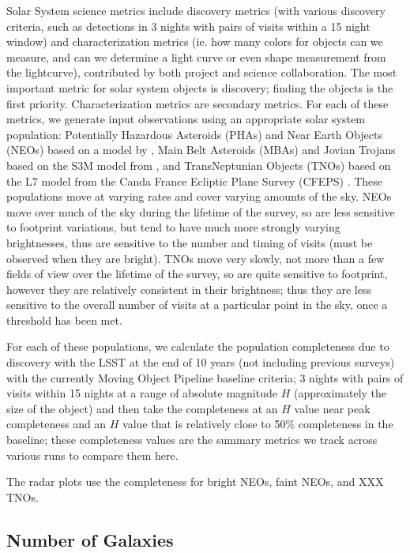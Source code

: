 Solar System science metrics include discovery metrics (with various discovery criteria, such as detections in 3 nights with pairs of visits within a 15 night window) and characterization metrics (ie. how many colors for objects can we measure, and can we determine a light curve or even shape measurement from the lightcurve), contributed by both project and science collaboration. The most important metric for solar system objects is discovery; finding the objects is the first priority. Characterization metrics are secondary metrics. For each of these metrics, we generate input observations using an appropriate solar system population: Potentially Hazardous Asteroids (PHAs) and Near Earth Objects (NEOs) based on a model by \citet{2018Icar..312..181G}, Main Belt Asteroids (MBAs) and Jovian Trojans based on the S3M model from \citet{2011PASP..123..423G}, and TransNeptunian Objects (TNOs) based on the L7 model from the Canda France Ecliptic Plane Survey (CFEPS) \citep{2009AJ....137.4917K, 2011AJ....142..131P}. These populations move at varying rates and cover varying amounts of the sky. NEOs move over much of the sky during the lifetime of the survey, so are less sensitive to footprint variations, but tend to have much more strongly varying brightnesses, thus are sensitive to the number and timing of visits (must be observed when they are bright). TNOs move very slowly, not more than a few fields of view over the lifetime of the survey, so are quite sensitive to footprint, however they are relatively consistent in their brightness; thus they are less sensitive to the overall number of visits at a particular point in the sky, once a threshold has been met. 

For each of these populations, we calculate the population completeness due to discovery with the LSST at the end of 10 years (not including previous surveys) with the currently Moving Object Pipeline baseline criteria; 3 nights with pairs of visits within 15 nights at a range of absolute magnitude $H$ (approximately the size of the object) and then take the completeness at an $H$ value near peak completeness and an $H$ value that is relatively close to 50\% completeness in the baseline; these completeness values are the summary metrics we track across various runs to compare them here. 

The radar plots use the completeness for bright NEOs, faint NEOs, and XXX TNOs. 

\subsection{Number of Galaxies}

